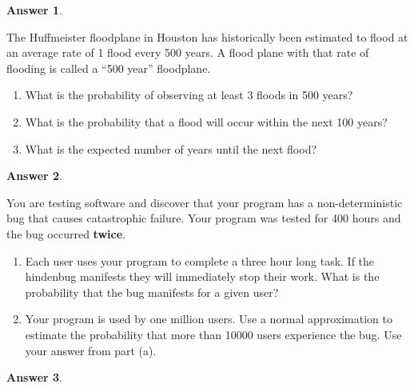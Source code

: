 \documentclass[12pt]{article}
\renewcommand{\(}{\left(}
\renewcommand{\)}{\right)}
\theoremstyle{definition}
\newtheorem*{answer}{Answer}
\begin{document}
\begin{enumerate}
{\begin{shaded}
\begin{answer}
    \end{answer}
    \end{shaded}
    \pagebreak
    \item The Huffmeister floodplane in Houston has historically been estimated to flood at an average rate of 1 flood every 500 years. A flood plane with that rate of flooding is called a ``500 year'' floodplane.
    \begin{enumerate}
        \item What is the probability of observing at least 3 floods in 500 years?
        \item What is the probability that a flood will occur within the next 100 years?
        \item What is the expected number of years until the next flood?
    \end{enumerate}
    
    \begin{shaded}
    \begin{answer}
    
    \end{answer}
    \end{shaded}
    \pagebreak
    \item You are testing software and discover that your program has a non-deterministic bug that causes catastrophic failure. Your program was tested for 400 hours and the bug occurred \textbf{twice}.
    \begin{enumerate}
        \item Each user uses your program to complete a three hour long task. If the hindenbug manifests they will immediately stop their work. What is the probability that the bug manifests for a given user?
        \item Your program is used by one million users. Use a normal approximation to estimate the probability that more than 10000 users experience the bug. Use your answer from part (a).
    \end{enumerate}
    
    \begin{shaded}
    \begin{answer}
    

\end{answer}
\end{shaded}}
\end{enumerate}
\end{document}
